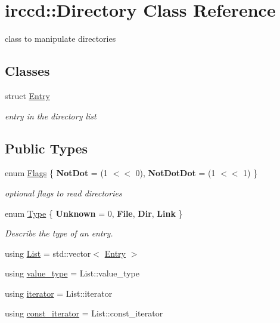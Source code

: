 \hypertarget{a00025}{\section{irccd\-:\-:Directory Class Reference}
\label{a00025}
}


class to manipulate directories  


\subsection*{Classes}
\begin{DoxyCompactItemize}
\item 
struct \hyperlink{a00026}{Entry}
\begin{DoxyCompactList}\small\item\em entry in the directory list \end{DoxyCompactList}\end{DoxyCompactItemize}
\subsection*{Public Types}
\begin{DoxyCompactItemize}
\item 
enum \hyperlink{a00025_acb3a455a66796739370b2ba3b8a5ed00}{Flags} \{ {\bfseries Not\-Dot} = (1 $<$$<$ 0), 
{\bfseries Not\-Dot\-Dot} = (1 $<$$<$ 1)
 \}
\begin{DoxyCompactList}\small\item\em optional flags to read directories \end{DoxyCompactList}\item 
enum \hyperlink{a00025_a12a53ee04d1d0de47e3ec9addf66d209}{Type} \{ {\bfseries Unknown} = 0, 
{\bfseries File}, 
{\bfseries Dir}, 
{\bfseries Link}
 \}
\begin{DoxyCompactList}\small\item\em Describe the type of an entry. \end{DoxyCompactList}\item 
using \hyperlink{a00025_a375d63db514c30cf26eac6d664525604}{List} = std\-::vector$<$ \hyperlink{a00026}{Entry} $>$
\item 
using \hyperlink{a00025_ad110f19a9dd69c4051884a061308e7fa}{value\-\_\-type} = List\-::value\-\_\-type
\item 
using \hyperlink{a00025_a6749daedacaff39269675e482a067167}{iterator} = List\-::iterator
\item 
using \hyperlink{a00025_a191500fda5dd33a3ec8fee40abe7b0cd}{const\-\_\-iterator} = List\-::const\-\_\-iterator
\end{DoxyCompactItemize}

